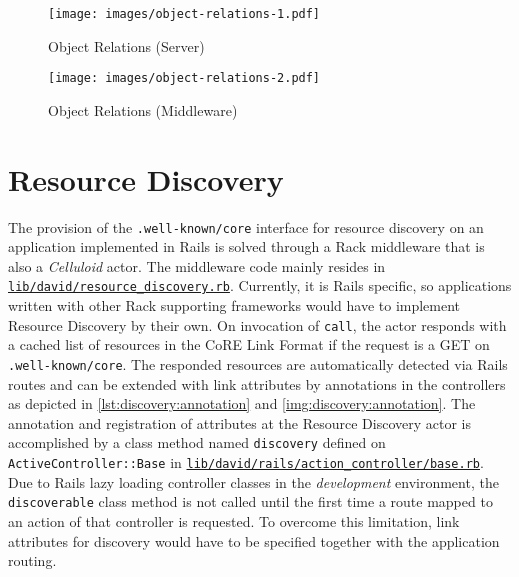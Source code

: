 		\begin{figure}
			\centering
			\texttt{[image: images/object-relations-1.pdf]}
			\caption{Object Relations (Server)}
			\label{fig:implementation:object-relations-1}
		\end{figure}

		\begin{figure}
			\centering
			\texttt{[image: images/object-relations-2.pdf]}
			\caption{Object Relations (Middleware)}
			\label{fig:implementation:object-relations-2}
		\end{figure}

\section{Resource Discovery}
\label{cha:implementation:discovery}

	The provision of the \texttt{.well-known/core} interface for resource
	discovery on an application implemented in \ac{Rails} is solved through a
	Rack middleware that is also a \emph{Celluloid} actor. The middleware code
	mainly resides in
	\href{https://github.com/nning/david/blob/0.4.3/lib/david/resource_discovery.rb}{\texttt{lib/david/resource\_discovery.rb}}.
	Currently, it is \ac{Rails} specific, so applications written with other
	Rack supporting frameworks would have to implement Resource Discovery by
	their own. On invocation of \texttt{call}, the actor responds with a cached
	list of resources in the CoRE Link Format \cite{link} if the request is a
	GET on \texttt{.well-known/core}. The responded resources are automatically
	detected via \ac{Rails} routes and can be extended with link attributes by
	annotations in the controllers as depicted in
	\autoref{lst:discovery:annotation} and \autoref{img:discovery:annotation}.
	The annotation and registration of attributes at the Resource Discovery
	actor is accomplished by a class method named \texttt{discovery} defined on
	\texttt{ActiveController::Base} in
	\href{https://github.com/nning/david/blob/0.4.3/lib/david/rails/action_controller/base.rb}{\texttt{lib/david/rails/action\_controller/base.rb}}.
	Due to \ac{Rails} lazy loading controller classes in the \emph{development}
	environment, the \texttt{discoverable} class method is not called until the
	first time a route mapped to an action of that controller is requested. To
	overcome this limitation, link attributes for discovery would have to be
	specified together with the application routing.

